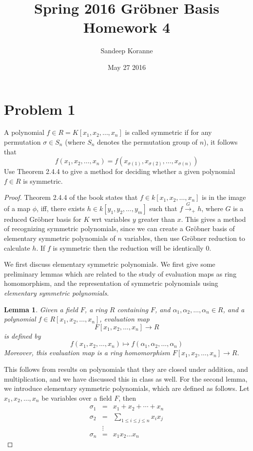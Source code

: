 \documentclass{article}[12pt]
\newtheorem{lem}{Lemma}
\begin{document}
\title{Spring 2016 Gr\"obner Basis Homework 4}
\author{Sandeep Koranne}
\date{May 27 2016}
\maketitle

\section*{Problem 1}A polynomial $f\in R=K[x_1,x_2,\ldots,x_n]$ is
called symmetric if for any permutation $\sigma\in S_n$ (where $S_n$
denotes the permutation group of $n$), it follows that
\[
f(x_1,x_2,\ldots,x_n) = f(x_{\sigma(1)},x_{\sigma(2)},\ldots,x_{\sigma(n)})
\]
Use Theorem 2.4.4 to give a method for deciding whether a given
polynomial $f\in R$ is symmetric.
\begin{proof}
Theorem 2.4.4 of the book states that $f\in k[x_1,x_2,\ldots,x_n]$
is in the image of a map $\phi$, iff, there exists $h\in k[y_1,y_2,\ldots,y_m]$
such that $f\xrightarrow{G}_+ h$, where $G$ is a reduced Gr\"obner basis
for $K$ wrt variables $y$ greater than $x$. 
This gives a method of recognizing symmetric polynomials, since we
can create a Gr\"obner basis of elementary symmetric polynomials of $n$
variables, then use Gr\"obner reduction to calculate $h$. If $f$ is symmetric
then the reduction will be identically 0.

We first discuss elementary symmetric polynomials.
We first give some preliminary lemmas which are related to the study of
evaluation maps as ring homomorphism, and the representation of symmetric
polynomials using \emph{elementary symmetric polynomials}.

\begin{lem}
Given a field $F$, a ring $R$ containing $F$, and 
$\alpha_1,\alpha_2,\ldots,\alpha_n \in R$, and a polynomial 
$f\in R[x_1,x_2,\ldots,x_n]$,
evaluation map
\[
F[x_1,x_2,\ldots,x_n] \to R
\]
is defined by 
\[
f(x_1,x_2,\ldots,x_n)\mapsto f(\alpha_1,\alpha_2,\ldots,\alpha_n)
\]
Moreover, this evaluation map is a ring homomorphism $F[x_1,x_2,\ldots,x_n]\to R$.
\label{lem:ring-homomorphism}
\end{lem}
This follows from results on polynomials that they are closed under
addition, and multiplication, and we have discussed this in class as well.
For the second lemma, we introduce elementary symmetric polynomials, which
are defined as follows. Let $x_1,x_2,\ldots,x_n$ be variables over a field
$F$, then
\begin{eqnarray}
\sigma_1 & = & x_1 + x_2 + \cdots + x_n \nonumber \\
\sigma_2 & = & \sum_{1 \le i \le j \le n} x_ix_j \nonumber \\
 & \vdots &  \nonumber \\
\sigma_n & = & x_1x_2\ldots x_n
\end{eqnarray}


\end{proof}
\end{document}
